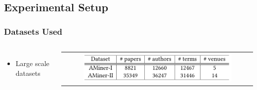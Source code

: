 \subsection{Experimental Setup}

\begin{frame}
\frametitle{Datasets Used}

\begin{columns}

\begin{itemize}
    \item Large scale datasets
\end{itemize}

\begin{center}
\begin{tabular}{c}
\includegraphics[width=0.8\textwidth]{img/datasets}
\end{tabular}
\end{center}
\end{columns}
\end{frame}

